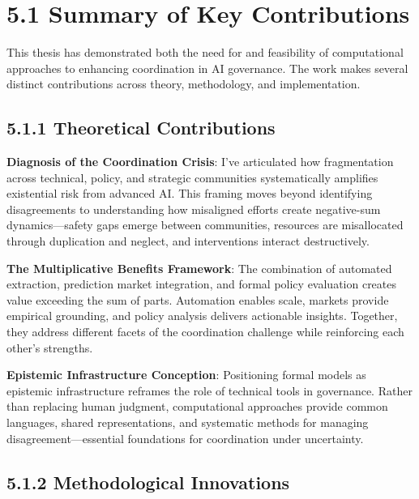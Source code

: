 \documentclass[
  11pt,
  letterpaper,
]{book}
\begin{document}
\section*{5.1 Summary of Key Contributions}\label{sec-key-contributions}


This thesis has demonstrated both the need for and feasibility of
computational approaches to enhancing coordination in AI governance. The
work makes several distinct contributions across theory, methodology,
and implementation.

\subsection*{5.1.1 Theoretical
Contributions}\label{sec-theoretical-contributions}

\textbf{Diagnosis of the Coordination Crisis}: I've articulated how
fragmentation across technical, policy, and strategic communities
systematically amplifies existential risk from advanced AI. This framing
moves beyond identifying disagreements to understanding how misaligned
efforts create negative-sum dynamics---safety gaps emerge between
communities, resources are misallocated through duplication and neglect,
and interventions interact destructively.

\textbf{The Multiplicative Benefits Framework}: The combination of
automated extraction, prediction market integration, and formal policy
evaluation creates value exceeding the sum of parts. Automation enables
scale, markets provide empirical grounding, and policy analysis delivers
actionable insights. Together, they address different facets of the
coordination challenge while reinforcing each other's strengths.

\textbf{Epistemic Infrastructure Conception}: Positioning formal models
as epistemic infrastructure reframes the role of technical tools in
governance. Rather than replacing human judgment, computational
approaches provide common languages, shared representations, and
systematic methods for managing disagreement---essential foundations for
coordination under uncertainty.

\subsection*{5.1.2 Methodological
Innovations}\label{sec-methodological-innovations}
\end{document}
